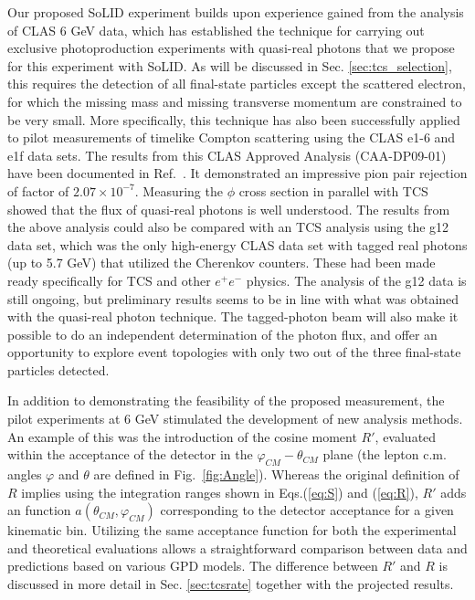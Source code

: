 Our proposed SoLID experiment builds upon experience gained from the analysis
of CLAS 6 GeV data, which has established the technique for carrying
out exclusive photoproduction experiments with quasi-real photons that we
propose for this experiment with SoLID. As will be discussed in Sec.
\ref{sec:tcs_selection}, this requires the detection of all final-state
particles except the scattered electron, for which the missing mass and
missing transverse momentum are constrained to be very small.
More specifically, this technique has also been successfully applied to pilot
measurements of timelike Compton scattering using the CLAS e1-6 and e1f data
sets. The results from this CLAS Approved Analysis (CAA-DP09-01) have been
documented in Ref.~\cite{Rafael:2010}. It demonstrated an impressive pion
pair rejection of factor of $2.07 \times 10^{-7}$. Measuring the $\phi$ cross
section in parallel with TCS showed that the flux of quasi-real photons is
well understood.
The results from the above analysis could also be compared with an TCS
analysis using the g12 data set, which was the only high-energy CLAS data set
with tagged real photons (up to 5.7 GeV) that utilized the Cherenkov counters.
These had been made ready specifically for TCS and other $e^+e^-$ physics. The
analysis of the g12 data is still ongoing, but preliminary results seems to be
in line with what was obtained with the quasi-real photon technique.
The tagged-photon beam will also make it possible to do an independent
determination of the photon flux, and offer an opportunity to explore event
topologies with only two out of the three final-state particles detected.

In addition to demonstrating the feasibility of the proposed measurement, the
pilot experiments at 6 GeV stimulated the development of new analysis methods.
An example of this was the introduction of the cosine moment $R'$, evaluated
within the acceptance of the detector in the $\varphi_{CM}-\theta_{CM}$ plane
(the lepton c.m. angles $\varphi$ and $\theta$ are defined in
Fig.~\ref{fig:Angle}). Whereas the original definition of $R$ implies using
the integration ranges shown in Eqs.(\ref{eq:S}) and (\ref{eq:R}), $R'$ adds
an function $a(\theta_{CM},\varphi_{CM})$ corresponding to the detector
acceptance for a given kinematic bin. Utilizing the same acceptance function
for both the experimental and theoretical evaluations allows a straightforward
comparison between data and predictions based on various GPD models. The
difference between $R'$ and $R$ is discussed in more detail in
Sec. \ref{sec:tcsrate} together with the projected results.

